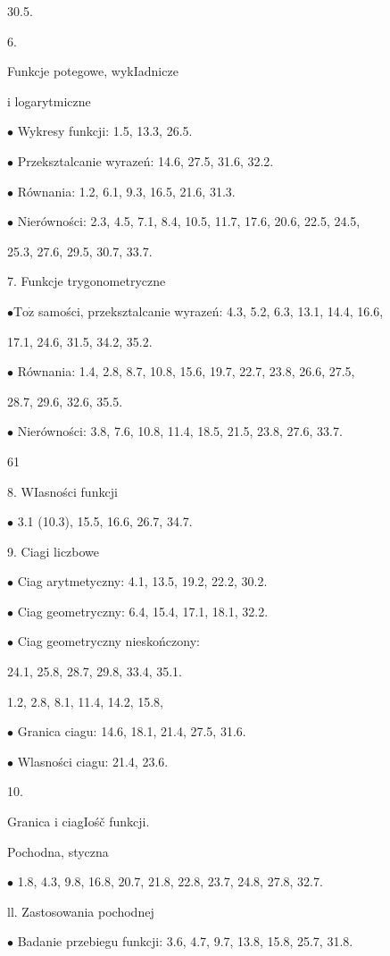 \documentclass[a4paper,12pt]{article}
\begin{document}
30.5.

6.

Funkcje potegowe, wykIadnicze

i logarytmiczne

$\bullet$ Wykresy funkcji: 1.5, 13.3, 26.5.

$\bullet$ Przeksztalcanie wyrazeń: 14.6, 27.5, 31.6, 32.2.

$\bullet$ Równania: 1.2, 6.1, 9.3, 16.5, 21.6, 31.3.

$\bullet$ Nierówności: 2.3, 4.5, 7.1, 8.4, 10.5, 11.7, 17.6, 20.6, 22.5, 24.5,

25.3, 27.6, 29.5, 30.7, 33.7.

7. Funkcje trygonometryczne

$\bullet \mathrm{T}\mathrm{o}\dot{\mathrm{z}}$ samości, przeksztalcanie wyrazeń: 4.3, 5.2, 6.3, 13.1, 14.4, 16.6,

17.1, 24.6, 31.5, 34.2, 35.2.

$\bullet$ Równania: 1.4, 2.8, 8.7, 10.8, 15.6, 19.7, 22.7, 23.8, 26.6, 27.5,

28.7, 29.6, 32.6, 35.5.

$\bullet$ Nierówności: 3.8, 7.6, 10.8, 11.4, 18.5, 21.5, 23.8, 27.6, 33.7.





61

8. WIasności funkcji

$\bullet$ 3.1 (10.3), 15.5, 16.6, 26.7, 34.7.

9. Ciagi liczbowe

$\bullet$ Ciag arytmetyczny: 4.1, 13.5, 19.2, 22.2, 30.2.

$\bullet$ Ciag geometryczny: 6.4, 15.4, 17.1, 18.1, 32.2.

$\bullet$ Ciag geometryczny nieskończony:

24.1, 25.8, 28.7, 29.8, 33.4, 35.1.

1.2, 2.8, 8.1, 11.4, 14.2, 15.8,

$\bullet$ Granica ciagu: 14.6, 18.1, 21.4, 27.5, 31.6.

$\bullet$ Wlasności ciagu: 21.4, 23.6.

10.

Granica i ciagIośč funkcji.

Pochodna, styczna

$\bullet$ 1.8, 4.3, 9.8, 16.8, 20.7, 21.8, 22.8, 23.7, 24.8, 27.8, 32.7.

ll. Zastosowania pochodnej

$\bullet$ Badanie przebiegu funkcji: 3.6, 4.7, 9.7, 13.8, 15.8, 25.7, 31.8.
\end{document}
